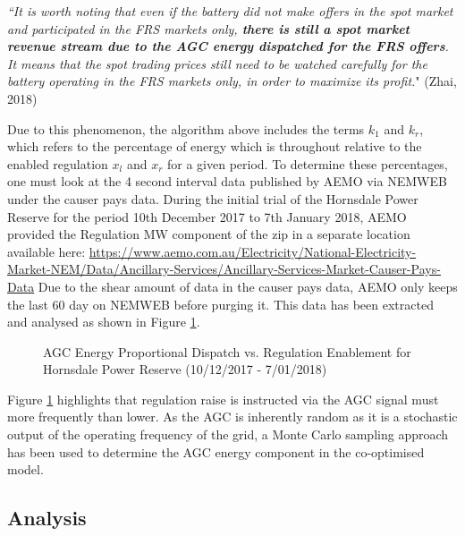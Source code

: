 \begin{tcolorbox}[colback=ocre!5!white,colframe=ocre]
\textit{``It is worth noting that even if the battery did not make offers in the spot market and participated in the FRS markets only, \textbf{there is still a spot market revenue stream due to the AGC energy dispatched for the FRS offers}. It means that the spot trading prices still need to be watched carefully for the battery operating in the FRS markets only, in order to maximize its profit.}" (Zhai, 2018)
\end{tcolorbox}
Due to this phenomenon, the algorithm above includes the terms $k_1$ and $k_r$, which refers to the percentage of energy which is throughout relative to the enabled regulation $x_l$ and $x_r$ for a given period. To determine these percentages, one must look at the 4 second interval data published by AEMO via NEMWEB under the causer pays data. During the initial trial of the Hornsdale Power Reserve for the period 10th December 2017 to 7th January 2018, AEMO provided the Regulation MW component of the zip in a separate location available here: \url{https://www.aemo.com.au/Electricity/National-Electricity-Market-NEM/Data/Ancillary-Services/Ancillary-Services-Market-Causer-Pays-Data}
Due to the shear amount of data in the causer pays data, AEMO only keeps the last 60 day on NEMWEB before purging it. This data has been extracted and analysed as shown in Figure \ref{fig:agc_energy}. 
\begin{figure}[H]
    \centering
    \caption{AGC Energy Proportional Dispatch vs. Regulation Enablement for Hornsdale Power Reserve (10/12/2017 - 7/01/2018) }
    \label{fig:agc_energy}
\end{figure}
Figure \ref{fig:agc_energy} highlights that regulation raise is instructed via the AGC signal must more frequently than lower. As the AGC is inherently random as it is a stochastic output of the operating frequency of the grid, a Monte Carlo sampling approach has been used to determine the AGC energy component in the co-optimised model.  
\subsection{Analysis}
